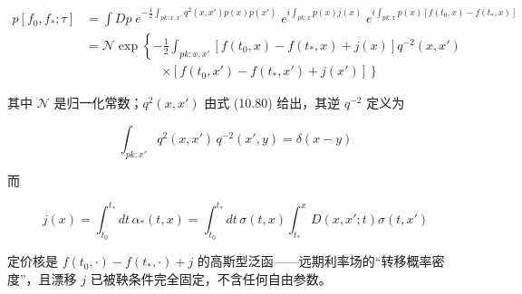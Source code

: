 \begin{equation*}
\begin{aligned}
p[f_0,f_*;\tau]
&=\int Dp\;e^{-\frac{1}{2}\int_{pk:x,x'}q^2(x,x')p(x)p(x')}\;e^{i\int_{pk:x}p(x)j(x)}\;e^{i\int_{pk:x}p(x)[f(t_0,x)-f(t_*,x)]}\\
&=\mathcal{N}\exp\left\{-\frac{1}{2}\int_{pk:x,x'}\left[f(t_0,x)-f(t_*,x)+j(x)\right]q^{-2}(x,x')\right.\\
&\qquad\qquad\qquad\left.\times\left[f(t_0,x')-f(t_*,x')+j(x')\right]\right\}
\end{aligned}
\end{equation*}

其中 $\mathcal{N}$ 是归一化常数；$q^2(x,x')$ 由式 (10.80) 给出，其逆 $q^{-2}$ 定义为

\begin{equation*}
\int_{pk:x'}q^2(x,x')\,q^{-2}(x',y)=\delta(x-y)
\end{equation*}

而

\begin{equation*}
j(x)=\int_{t_0}^{t_*}dt\,\alpha_*(t,x)=\int_{t_0}^{t_*}dt\,\sigma(t,x)\int_{t_*}^x D(x,x';t)\sigma(t,x')
\end{equation*}

定价核是 $f(t_0,\cdot)-f(t_*,\cdot)+j$ 的高斯型泛函——远期利率场的“转移概率密度”，且漂移 $j$ 已被鞅条件完全固定，不含任何自由参数。

